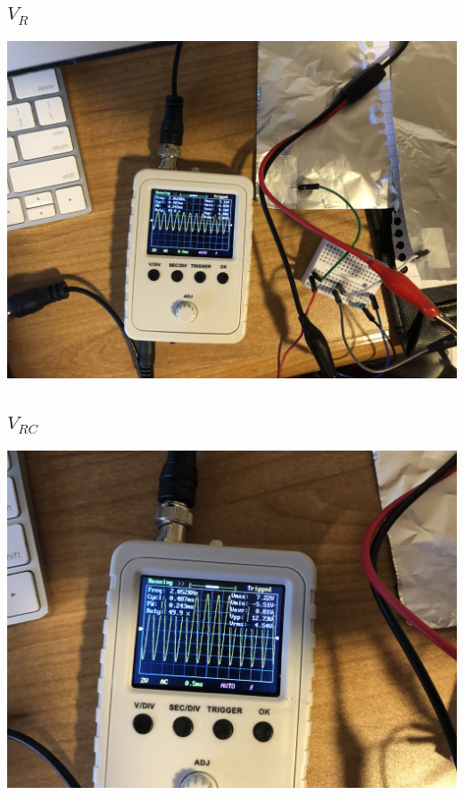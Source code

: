 \documentclass{article}
\begin{document}
\begin{center}
  \subsection*{\(V_R\)}
  \includegraphics[scale=0.1]{2.jpeg}
  \subsection*{\(V_{RC}\)}
  \includegraphics[scale=0.1]{1.jpeg}
\end{center}
\end{document}
